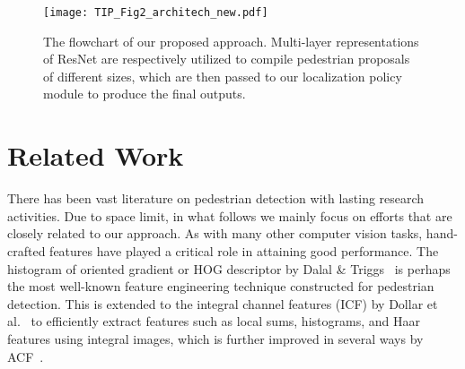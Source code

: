 \documentclass[10pt,journal,compsoc,twoside]{IEEEtran}
\begin{document}
\begin{figure*}[!t]
\centering
\texttt{[image: TIP\_Fig2\_architech\_new.pdf]}
\caption{The flowchart of our proposed approach. Multi-layer representations of ResNet are respectively utilized to compile pedestrian proposals of different sizes, which are then passed to our localization policy module to produce the final outputs.
}
\label{fig_2}
\end{figure*}





\section{Related Work}
\label{sec:related work}

There has been vast literature on pedestrian detection with lasting research activities. Due to space limit, in what follows we mainly focus on efforts that are closely related to our approach. As with many other computer vision tasks, hand-crafted features have played a critical role in attaining good performance. The histogram of oriented gradient or HOG descriptor by Dalal \& Triggs~\cite{DalTri:cvpr05} is perhaps the most well-known feature engineering technique constructed for pedestrian detection. This is extended to the integral channel features (ICF) by Dollar et al.~\cite{DolEtAl:bmvc09} to efficiently extract features such as local sums, histograms, and Haar features using integral images, which is further improved in several ways by ACF~\cite{DolEtAl:tpami14}.
\end{document}
